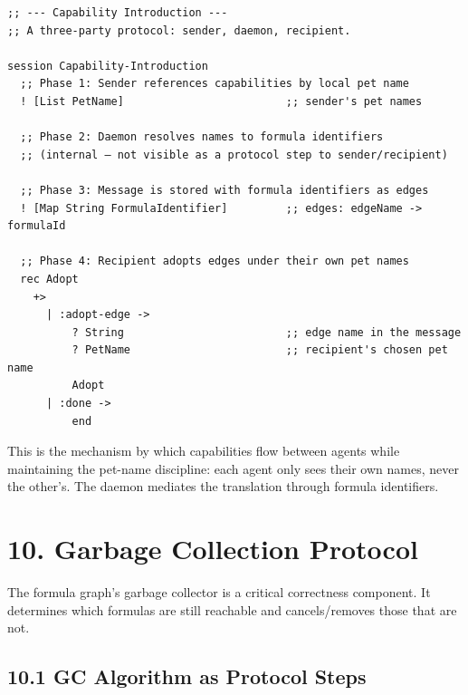 \documentclass[11pt]{article}
\begin{document}
\begin{verbatim}
;; --- Capability Introduction ---
;; A three-party protocol: sender, daemon, recipient.

session Capability-Introduction
  ;; Phase 1: Sender references capabilities by local pet name
  ! [List PetName]                         ;; sender's pet names

  ;; Phase 2: Daemon resolves names to formula identifiers
  ;; (internal — not visible as a protocol step to sender/recipient)

  ;; Phase 3: Message is stored with formula identifiers as edges
  ! [Map String FormulaIdentifier]         ;; edges: edgeName -> formulaId

  ;; Phase 4: Recipient adopts edges under their own pet names
  rec Adopt
    +>
      | :adopt-edge ->
          ? String                         ;; edge name in the message
          ? PetName                        ;; recipient's chosen pet name
          Adopt
      | :done ->
          end
\end{verbatim}

This is the mechanism by which capabilities flow between agents while
maintaining the pet-name discipline: each agent only sees their own names,
never the other's. The daemon mediates the translation through formula
identifiers.
\section{10. Garbage Collection Protocol}
\label{sec:org4cb1879}

The formula graph's garbage collector is a critical correctness component.
It determines which formulas are still reachable and cancels/removes those
that are not.
\subsection{10.1 GC Algorithm as Protocol Steps}
\label{sec:orgde038bb}
\end{document}
